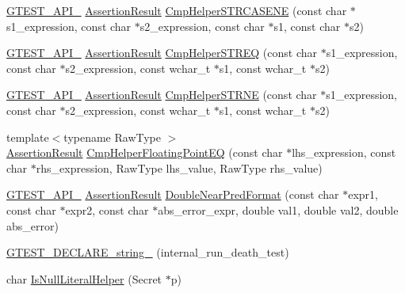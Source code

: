 \begin{DoxyCompactItemize}
\item 
\mbox{\hyperlink{gtest-port_8h_aa73be6f0ba4a7456180a94904ce17790}{G\+T\+E\+S\+T\+\_\+\+A\+P\+I\+\_\+}} \mbox{\hyperlink{classtesting_1_1_assertion_result}{Assertion\+Result}} \mbox{\hyperlink{namespacetesting_1_1internal_a5f74b933606b0a742cd5a8ad2d7087e0}{Cmp\+Helper\+S\+T\+R\+C\+A\+S\+E\+NE}} (const char $\ast$s1\+\_\+expression, const char $\ast$s2\+\_\+expression, const char $\ast$s1, const char $\ast$s2)
\item 
\mbox{\hyperlink{gtest-port_8h_aa73be6f0ba4a7456180a94904ce17790}{G\+T\+E\+S\+T\+\_\+\+A\+P\+I\+\_\+}} \mbox{\hyperlink{classtesting_1_1_assertion_result}{Assertion\+Result}} \mbox{\hyperlink{namespacetesting_1_1internal_ad40d557f9c157790160d6e4f2b0d9bab}{Cmp\+Helper\+S\+T\+R\+EQ}} (const char $\ast$s1\+\_\+expression, const char $\ast$s2\+\_\+expression, const wchar\+\_\+t $\ast$s1, const wchar\+\_\+t $\ast$s2)
\item 
\mbox{\hyperlink{gtest-port_8h_aa73be6f0ba4a7456180a94904ce17790}{G\+T\+E\+S\+T\+\_\+\+A\+P\+I\+\_\+}} \mbox{\hyperlink{classtesting_1_1_assertion_result}{Assertion\+Result}} \mbox{\hyperlink{namespacetesting_1_1internal_a6e700804399b6694d8d6157e3a141b17}{Cmp\+Helper\+S\+T\+R\+NE}} (const char $\ast$s1\+\_\+expression, const char $\ast$s2\+\_\+expression, const wchar\+\_\+t $\ast$s1, const wchar\+\_\+t $\ast$s2)
\item 
{\footnotesize template$<$typename Raw\+Type $>$ }\\\mbox{\hyperlink{classtesting_1_1_assertion_result}{Assertion\+Result}} \mbox{\hyperlink{namespacetesting_1_1internal_a98ce463e5dbe0c6120fa817e1f8f2944}{Cmp\+Helper\+Floating\+Point\+EQ}} (const char $\ast$lhs\+\_\+expression, const char $\ast$rhs\+\_\+expression, Raw\+Type lhs\+\_\+value, Raw\+Type rhs\+\_\+value)
\item 
\mbox{\hyperlink{gtest-port_8h_aa73be6f0ba4a7456180a94904ce17790}{G\+T\+E\+S\+T\+\_\+\+A\+P\+I\+\_\+}} \mbox{\hyperlink{classtesting_1_1_assertion_result}{Assertion\+Result}} \mbox{\hyperlink{namespacetesting_1_1internal_aea60207c4cedc8946a70ada62e38da8f}{Double\+Near\+Pred\+Format}} (const char $\ast$expr1, const char $\ast$expr2, const char $\ast$abs\+\_\+error\+\_\+expr, double val1, double val2, double abs\+\_\+error)
\item 
\mbox{\hyperlink{namespacetesting_1_1internal_ac20f635c3285878fc1195ce687f23950}{G\+T\+E\+S\+T\+\_\+\+D\+E\+C\+L\+A\+R\+E\+\_\+string\+\_\+}} (internal\+\_\+run\+\_\+death\+\_\+test)
\item 
char \mbox{\hyperlink{namespacetesting_1_1internal_afb0731ba39ffef1fa1730ac0699c9025}{Is\+Null\+Literal\+Helper}} (Secret $\ast$p)

\end{DoxyCompactItemize}
